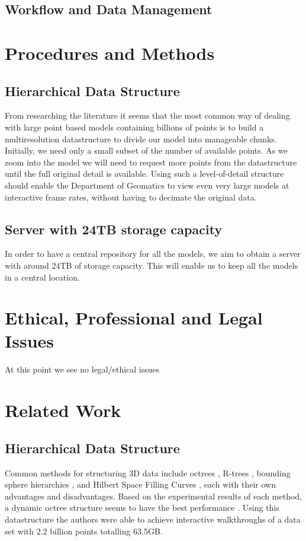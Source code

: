\documentclass[12pt,a4paper]{article}
\begin{document}
\subsection{Workflow and Data Management}

\section{Procedures and Methods}
\subsection{Hierarchical Data Structure}
From researching the literature it seems that the most common way of dealing with large point based models containing billions of points is to build a multiresolution datastructure to divide our model into manageable chunks. Initially, we need only a small subset of the number of available points. As we zoom into the model we will need to request more points from the datastructure until the full original detail is available. Using such a level-of-detail structure should enable the Department of Geomatics to view even very large models at interactive frame rates, without having to decimate the original data.
\subsection{Server with 24TB storage capacity}
In order to have a central repository for all the models, we aim to obtain a server with around 24TB of storage capacity. This will enable us to keep all the models in a central location.

\section{Ethical, Professional and Legal Issues}
At this point we see no legal/ethical issues

\section{Related Work}
\subsection{Hierarchical Data Structure}
Common methods for structuring 3D data include octrees \cite{interactivepointclouds}, R-trees \cite{rtree}, bounding sphere hierarchies \cite{qsplat}, and Hilbert Space Filling Curves \cite{hilbert}, each with their own advantages and disadvantages. Based on the experimental results of each method, a dynamic octree structure seems to have the best performance \cite{interactivepointclouds}. Using this datastructure the authors were able to achieve interactive walkthroughs of a data set with 2.2 billion points totalling 63.5GB.
\end{document}
